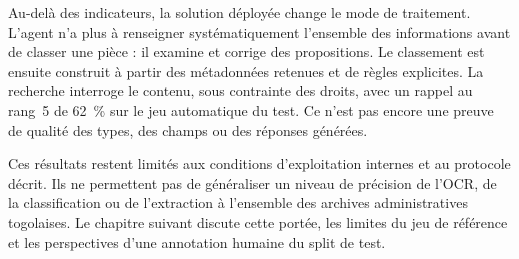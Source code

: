 Au-delà des indicateurs, la solution déployée change le mode de traitement. L'agent n'a plus à renseigner systématiquement l'ensemble des informations avant de classer une pièce : il examine et corrige des propositions. Le classement est ensuite construit à partir des métadonnées retenues et de règles explicites. La recherche interroge le contenu, sous contrainte des droits, avec un rappel au rang~5 de 62~\% sur le jeu automatique du test. Ce n'est pas encore une preuve de qualité des types, des champs ou des réponses générées.

Ces résultats restent limités aux conditions d'exploitation internes et au protocole décrit. Ils ne permettent pas de généraliser un niveau de précision de l'OCR, de la classification ou de l'extraction à l'ensemble des archives administratives togolaises. Le chapitre suivant discute cette portée, les limites du jeu de référence et les perspectives d'une annotation humaine du split de test.
